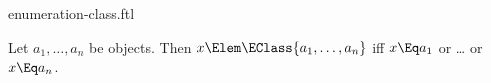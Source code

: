 \documentclass{stex}
\begin{document}
\begin{smodule}{enumeration-class.ftl}


\begin{fakeforthel}
  \begin{axiom*}
    Let $a_1,\dots,a_n$ be objects.
    Then $x \Elem \EClass{a_1,\dots,a_n}$ iff $x \Eq a_1$ or \dots{} or $x \Eq a_n$.
  \end{axiom*}
\end{fakeforthel}

\end{smodule}
\end{document}
